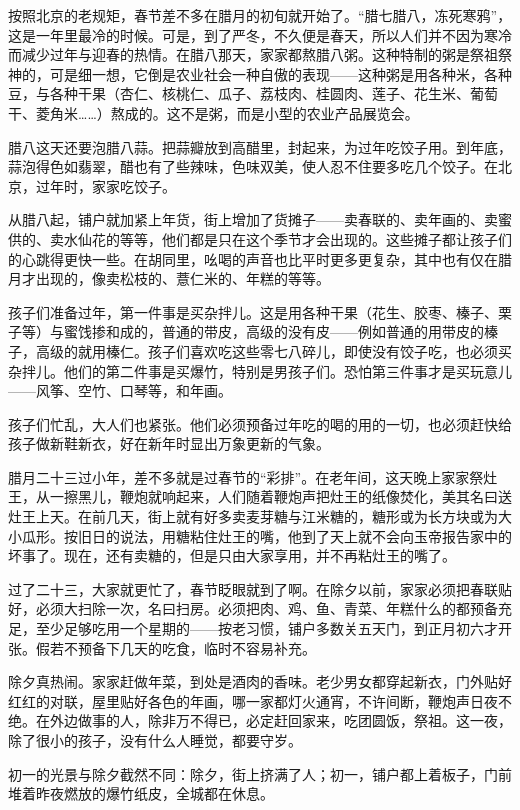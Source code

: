 \documentclass[12pt,UTF8]{ctexbook}
\begin{document}
按照北京的老规矩，春节差不多在腊月的初旬就开始了。“腊七腊八，冻死寒鸦”，这是一年里最冷的时候。可是，到了严冬，不久便是春天，所以人们并不因为寒冷而减少过年与迎春的热情。在腊八那天，家家都熬腊八粥。这种特制的粥是祭祖祭神的，可是细一想，它倒是农业社会一种自傲的表现——这种粥是用各种米，各种豆，与各种干果（杏仁、核桃仁、瓜子、荔枝肉、桂圆肉、莲子、花生米、葡萄干、菱角米……）熬成的。这不是粥，而是小型的农业产品展览会。

腊八这天还要泡腊八蒜。把蒜瓣放到高醋里，封起来，为过年吃饺子用。到年底，蒜泡得色如翡翠，醋也有了些辣味，色味双美，使人忍不住要多吃几个饺子。在北京，过年时，家家吃饺子。

从腊八起，铺户就加紧上年货，街上增加了货摊子——卖春联的、卖年画的、卖蜜供的、卖水仙花的等等，他们都是只在这个季节才会出现的。这些摊子都让孩子们的心跳得更快一些。在胡同里，吆喝的声音也比平时更多更复杂，其中也有仅在腊月才出现的，像卖松枝的、薏仁米的、年糕的等等。

孩子们准备过年，第一件事是买杂拌儿。这是用各种干果（花生、胶枣、榛子、栗子等）与蜜饯掺和成的，普通的带皮，高级的没有皮——例如普通的用带皮的榛子，高级的就用榛仁。孩子们喜欢吃这些零七八碎儿，即使没有饺子吃，也必须买杂拌儿。他们的第二件事是买爆竹，特别是男孩子们。恐怕第三件事才是买玩意儿——风筝、空竹、口琴等，和年画。

孩子们忙乱，大人们也紧张。他们必须预备过年吃的喝的用的一切，也必须赶快给孩子做新鞋新衣，好在新年时显出万象更新的气象。

腊月二十三过小年，差不多就是过春节的“彩排”。在老年间，这天晚上家家祭灶王，从一擦黑儿，鞭炮就响起来，人们随着鞭炮声把灶王的纸像焚化，美其名曰送灶王上天。在前几天，街上就有好多卖麦芽糖与江米糖的，糖形或为长方块或为大小瓜形。按旧日的说法，用糖粘住灶王的嘴，他到了天上就不会向玉帝报告家中的坏事了。现在，还有卖糖的，但是只由大家享用，并不再粘灶王的嘴了。

过了二十三，大家就更忙了，春节眨眼就到了啊。在除夕以前，家家必须把春联贴好，必须大扫除一次，名曰扫房。必须把肉、鸡、鱼、青菜、年糕什么的都预备充足，至少足够吃用一个星期的——按老习惯，铺户多数关五天门，到正月初六才开张。假若不预备下几天的吃食，临时不容易补充。

除夕真热闹。家家赶做年菜，到处是酒肉的香味。老少男女都穿起新衣，门外贴好红红的对联，屋里贴好各色的年画，哪一家都灯火通宵，不许间断，鞭炮声日夜不绝。在外边做事的人，除非万不得已，必定赶回家来，吃团圆饭，祭祖。这一夜，除了很小的孩子，没有什么人睡觉，都要守岁。

初一的光景与除夕截然不同：除夕，街上挤满了人；初一，铺户都上着板子，门前堆着昨夜燃放的爆竹纸皮，全城都在休息。
\end{document}
